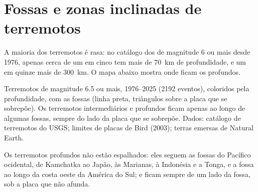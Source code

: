\section{Fossas e zonas inclinadas de terremotos}

A maioria dos terremotos é rasa: no catálogo dos de magnitude 6 ou mais desde
1976, apenas cerca de um em cinco tem mais de \qty{70}{km} de profundidade, e
um em quinze mais de \qty{300}{km}. O mapa abaixo mostra onde ficam os
profundos.

\begin{omfigure}

{\small Terremotos de magnitude 6.5 ou mais, 1976--2025 (2192 eventos),
coloridos pela profundidade, com as fossas (linha preta, triângulos sobre a
placa que se sobrepõe). Os terremotos intermediários e profundos ficam
apenas ao longo de algumas fossas, sempre do lado da placa que se sobrepõe.
Dados: catálogo de terremotos do USGS; limites de placas de Bird (2003);
terras emersas de Natural Earth.}
\end{omfigure}

Os terremotos profundos não estão espalhados: eles seguem as fossas do
Pacífico ocidental, de Kamchatka ao Japão, às Marianas, à Indonésia e a
Tonga, e a fossa ao longo da costa oeste da América do Sul; e ficam sempre
de um lado da fossa, sob a placa que não afunda.


